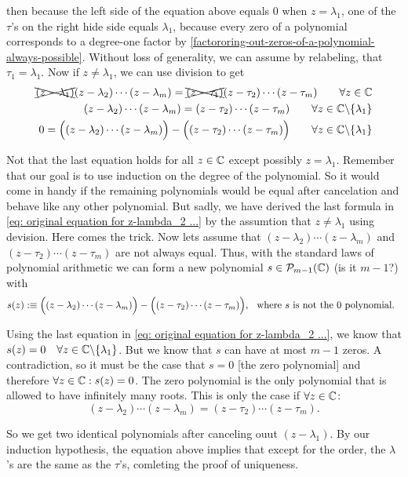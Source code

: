 \begin{prf}
  then because the left side of the equation above equals $0$ when $z=\lambda_1$, one of the $\tau$'s on the right hide side equals $\lambda_1$, because every zero of a polynomial corresponds to a degree-one factor by \ref{factororing-out-zeros-of-a-polynomial-always-possible}. Without loss of generality, we can assume by relabeling, that $\tau_1 = \lambda_1$. Now if $z \neq \lambda_1$, we can use division to get
  \begin{equation}
    \label{eq: original equation for z-lambda_2 ...}
    \begin{aligned}
      \xcancel{(z - \lambda_1)} (z - \lambda_2) \cdots (z-\lambda_m) = \xcancel{(z-\tau_1)} (z-\tau_2) \cdots (z-\tau_m) \qquad \forall z \in \mathbb{C} \\
      (z - \lambda_2) \cdots (z-\lambda_m) = (z-\tau_2) \cdots (z-\tau_m) \qquad  \forall z \in \mathbb{C} \backslash \{ \lambda_1 \} \\
      0 = \Big((z - \lambda_2) \cdots (z-\lambda_m) \Big) -   \Big((z-\tau_2) \cdots (z-\tau_m)\Big) \qquad \forall z \in \mathbb{C} \backslash \{ \lambda_1 \}
    \end{aligned}
  \end{equation}

  Not that the last equation holds for all $z \in \mathbb{C}$ except possibly $z = \lambda_1$. Remember that our goal is to use induction on the degree of the polynomial. So it would come in handy if the remaining polynomials would be equal after cancelation and behave like any other polynomial. But sadly, we have derived the last formula in \eqref{eq: original equation for z-lambda_2 ...} by the assumtion that $z \neq \lambda_1$ using devision. Here comes the trick. Now lets assume that $(z - \lambda_2) \cdots (z-\lambda_m)$ and $(z - \tau_2) \cdots (z-\tau_m)$ are not always equal. Thus, with the standard laws of polynomial arithmetic we can form a new polynomial $s \in \mathcal{P}_{m-1}(\mathbb{C})$ (is it $m-1$?) with
  \begin{equation}
    s(z) :\equiv   \Big((z - \lambda_2) \cdots (z-\lambda_m)\Big) - \Big((z-\tau_2) \cdots (z-\tau_m)\Big), \;\;\, \text{where $s$ is not the $0$ polynomial.}\;\;
  \end{equation}

   Using the last equation in \eqref{eq: original equation for z-lambda_2 ...}, we know that $s(z) = 0 \quad \forall z \in \mathbb{C} \backslash \{\lambda_1\}$. But we know that $s$ can have at most $m-1$ zeros. A contradiction, so it must be the case that $s = 0$ [the zero polynomial] and therefore $\forall z \in \mathbb{C}: s(z) = 0$. The zero polynomial is the only polynomial that is allowed to have infinitely many roots. This is only the case if $\forall z \in \mathbb{C}$:
   \[
    (z - \lambda_2) \cdots (z-\lambda_m) = (z - \tau_2) \cdots (z-\tau_m).
   \]

   So we get two identical polynomials after canceling ouut $(z-\lambda_1)$. By our induction hypothesis, the equation above implies that except for the order, the $\lambda$'s are the same as the $\tau$'s, comleting the proof of uniqueness.
\end{prf}


